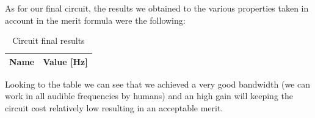 As for our final circuit, the results we obtained to the various properties taken in account in the merit formula were the following:

\begin{table}[h]
  \centering
  \begin{tabular}{|l|r|}
    \hline    
    {\bf Name} & {\bf Value [Hz]} \\ \hline
    
  \end{tabular}
  \caption{Circuit final results}
  \label{tab:merit}
\end{table} 

Looking to the table we can see that we achieved a very good bandwidth (we can work in all audible frequencies by humans) and an high gain will keeping the circuit cost 
relatively low resulting in an acceptable merit. 
